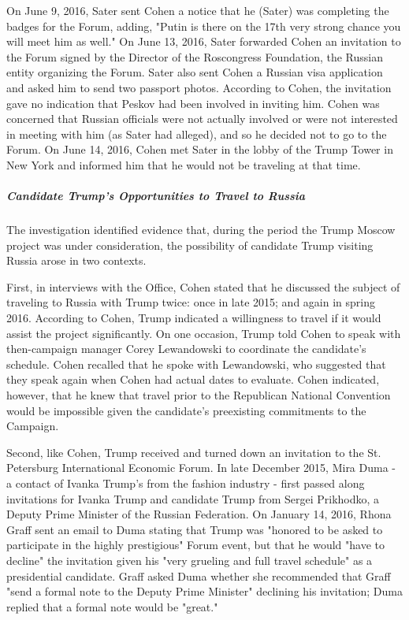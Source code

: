 On June 9, 2016, Sater sent Cohen a notice that he (Sater) was completing the badges for the Forum, adding, "Putin is there on the 17th very strong chance you will meet him as well."%
On June 13, 2016, Sater forwarded Cohen an invitation to the Forum signed by the Director of the Roscongress Foundation, the Russian entity organizing the Forum.%
Sater also sent Cohen a Russian visa application and asked him to send two passport photos.%
According to Cohen, the invitation gave no indication that Peskov had been involved in inviting him.
Cohen was concerned that Russian officials were not actually involved or were not interested in meeting with him (as Sater had alleged), and so he decided not to go to the Forum.%
On June 14, 2016, Cohen met Sater in the lobby of the Trump Tower in New York and informed him that he would not be traveling at that time.%

\subparagraph{Candidate Trump's Opportunities to Travel to Russia}

The investigation identified evidence that, during the period the Trump Moscow project was under consideration, the possibility of candidate Trump visiting Russia arose in two contexts.

First, in interviews with the Office, Cohen stated that he discussed the subject of traveling to Russia with Trump twice: once in late 2015; and again in spring 2016.%
According to Cohen, Trump indicated a willingness to travel if it would assist the project significantly.
On one occasion, Trump told Cohen to speak with then-campaign manager Corey Lewandowski to coordinate the candidate's schedule.
Cohen recalled that he spoke with Lewandowski, who suggested that they speak again when Cohen had actual dates to evaluate.
Cohen indicated, however, that he knew that travel prior to the Republican National Convention would be impossible given the candidate's preexisting commitments to the Campaign.%

Second, like Cohen, Trump received and turned down an invitation to the St. Petersburg International Economic Forum.
In late December 2015, Mira Duma - a contact of Ivanka Trump's from the fashion industry - first passed along invitations for Ivanka Trump and candidate Trump from Sergei Prikhodko, a Deputy Prime Minister of the Russian Federation.%
On January 14, 2016, Rhona Graff sent an email to Duma stating that Trump was "honored to be asked to participate in the highly prestigious" Forum event, but that he would "have to decline" the invitation given his "very grueling and full travel schedule" as a presidential candidate.%
Graff asked Duma whether she recommended that Graff "send a formal note to the Deputy Prime Minister" declining his invitation; Duma replied that a formal note would be "great."%

